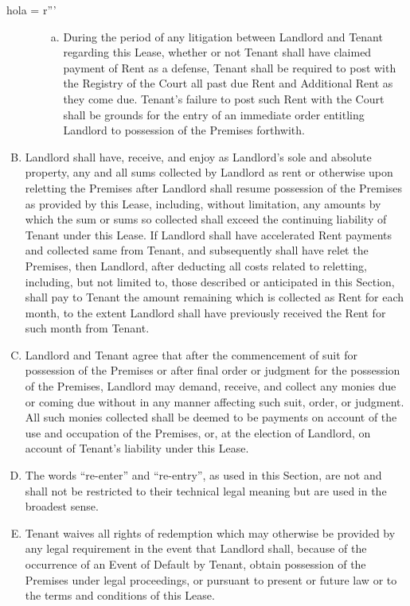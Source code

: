 hola = r'''\documentclass{article}
\begin{document}
\begin{enumerate}[(A)]
\begin{enumerate}[I]
\begin{enumerate}[(a)]
    \item  During the period of any litigation between Landlord and Tenant regarding this Lease, whether or not Tenant shall have claimed payment of Rent as a defense, Tenant shall be required to post with the Registry of the Court all past due Rent and Additional Rent as they come due.  Tenant's failure to post such Rent with the Court shall be grounds for the entry of an immediate order entitling Landlord to possession of the Premises forthwith. 
    \end{enumerate}
    \end{enumerate}
    \item \label{Subsection F}	Landlord shall have, receive, and enjoy as Landlord's sole and absolute property, any and all sums collected by Landlord as rent or otherwise upon reletting the Premises after Landlord shall resume possession of the Premises as provided by this Lease, including, without limitation, any amounts by which the sum or sums so collected shall exceed the continuing liability of Tenant under this Lease. If Landlord shall have accelerated Rent payments and collected same from Tenant, and subsequently shall have relet the Premises, then Landlord, after deducting all costs related to reletting, including, but not limited to, those described or anticipated in this Section, shall pay to Tenant the amount remaining which is collected as Rent for each month, to the extent Landlord shall have previously received the Rent for such month from Tenant.

    \item	Landlord and Tenant agree that after the commencement of suit for possession of the Premises or after final order or judgment for the possession of the Premises, Landlord may demand, receive, and collect any monies due or coming due without in any manner affecting such suit, order, or judgment. All such monies collected shall be deemed to be payments on account of the use and occupation of the Premises, or, at the election of Landlord, on account of Tenant's liability under this Lease.

    \item	The words ``re-enter'' and ``re-entry'', as used in this Section, are not and shall not be restricted to their technical legal meaning but are used in the broadest sense.

    \item	Tenant waives all rights of redemption which may otherwise be provided by any legal requirement in the event that Landlord shall, because of the occurrence of an Event of Default by Tenant, obtain possession of the Premises under legal proceedings, or pursuant to present or future law or to the terms and conditions of this Lease.


\end{enumerate}
\end{document}
